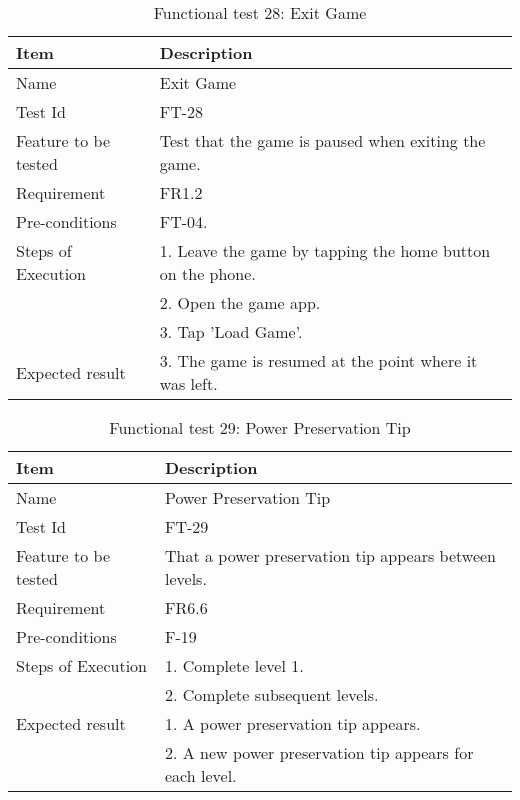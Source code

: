 \begin{table}[H]
\centering
	\begin{tabular}{ l | p{8cm} }
		\hline
		\rowcolor{lightgray}
		{\bf Item} & {\bf Description} \\ \hline
		Name & Exit Game \\ 
		Test Id & FT-28 \\ 
		Feature to be tested & Test that the game is paused when exiting the game. \\ 
		Requirement & FR1.2 \\ 
		Pre-conditions & FT-04. \\ 
		Steps of Execution & 1. Leave the game by tapping the home button on the phone. \\
		& 2. Open the game app. \\
		& 3. Tap 'Load Game'. \\
		Expected result & 3. The game is resumed at the point where it was left. \\ 
		\hline
	\end{tabular}
	\caption{Functional test 28: Exit Game}
\end{table}

\begin{table}[H]
\centering
	\begin{tabular}{ l | p{8cm} }
		\hline
		\rowcolor{lightgray}
		{\bf Item} & {\bf Description} \\ \hline
		Name & Power Preservation Tip \\ 
		Test Id & FT-29 \\ 
		Feature to be tested & That a power preservation tip appears between levels. \\ 
		Requirement & FR6.6 \\ 
		Pre-conditions & F-19 \\ 
		Steps of Execution & 1. Complete level 1. \\
		& 2. Complete subsequent levels. \\
		Expected result & 1. A power preservation tip appears. \\
		& 2. A new power preservation tip appears for each level. \\
		\hline
	\end{tabular}
	\caption{Functional test 29: Power Preservation Tip}
\end{table}

